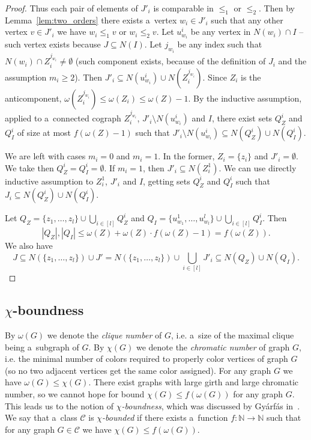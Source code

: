 \documentclass[11pt,a4paper]{article}
\theoremstyle{definition}
\renewcommand{\varnothing}{\emptyset}
\def\C{\mathcal{C}}
\def\N{\mathbb{N}}
\newcommand{\Jadwiga}[2][]{\todo[color=yellow!80,inline,#1]{{\textbf{J:} #2}}}
\begin{document}
\begin{proof}
    Thus each pair of elements of $J'_i$ is comparable in $\leq_1$ or $\leq_2$. Then by Lemma~\ref{lem:two_orders} there exists a~vertex $w_i\in J'_i$ such that any other vertex $v\in J'_i$ we have $w_i\leq_1 v$ or $w_i\leq_2 v$. 
    Let $u^i_{w_i}$ be any vertex in $N(w_i)\cap I$ -- such vertex exists because $J\subseteq N(I)$. Let $j_{w_i}$ be any index such that $N({w_i})\cap Z_i^{j_{w_i}} \neq \varnothing$ (such component exists, because of the definition of $J_i$ and the assumption $m_i\geq 2$). Then $J'_i\subseteq N(u_{w_i}^i)\cup N(Z_i^{j_{w_i}})$. 
    Since $Z_i$ is the anticomponent, $\omega(Z_i^{j_{w_i}})\leq \omega(Z_i) \leq \omega(Z) - 1$. 
    By the inductive assumption, applied to a~connected cograph $Z_i^{j_{w_i}}$, $J'_i\setminus N(u_{w_i}^i)$ and $I$, there exist sets $Q_Z^i$ and $Q_I^i$ of size at most $f(\omega(Z)-1)$ such that $J'_i\setminus N(u_{w_i}^i) \subseteq N(Q_Z^i) \cup N(Q_I^i)$. 

    We are left with cases $m_i=0$ and $m_i=1$. In the former, $Z_i=\{z_i\}$ and $J'_i=\varnothing$. We take then $Q_Z^i=Q_I^i=\varnothing$. If $m_i = 1$, then $J'_i\subseteq N(Z_i^1)$. We can use directly inductive assumption to $Z_i^1$, $J'_i$ and $I$, getting sets $Q_Z^i$ and $Q_I^i$ such that $J_i\subseteq N(Q_Z^i)\cup N(Q_I^i)$.
    
    Let $Q_Z = \{z_1, \dots, z_l\} \cup \bigcup_{i\in [l]} Q_Z^i$ and $Q_I = \{u_{w_1}^1, \dots, u_{w_l}^l\} \cup \bigcup_{i\in [l]} Q_I^i$. Then 
    \[ |Q_Z|, |Q_I|\leq \omega(Z) + \omega(Z) \cdot f(\omega(Z) - 1) = f(\omega(Z)). \]
    We also have $$J \subseteq N(\{z_1, \dots, z_l\})\cup J' = N(\{z_1, \dots, z_l\}) \cup \bigcup_{i\in [l]} J'_i \subseteq N(Q_Z) \cup N(Q_I).$$
\end{proof}


\subsection{$\chi$-boundness}

By $\omega(G)$ we denote the {\it clique number} of $G$, i.e. a~size of the maximal clique being a~subgraph of $G$.  By $\chi(G)$ we denote the {\it chromatic number} of graph $G$, i.e. the minimal number of colors required to properly color vertices of graph $G$ (so no two adjacent vertices get the same color assigned). For any graph $G$ we have $\omega(G)\leq \chi(G)$. There exist graphs with large girth and large chromatic number, so we cannot hope for bound $\chi(G)\leq f(\omega(G))$ for any graph $G$. This leads us to the notion of {\it $\chi$-boundness}, which was discussed by Gyárfás in~\cite{chiBoundness}. We say that a~class $\C$ is $\chi${\it -bounded} if there exists a~function $f\colon \N\to\N$ such that for any graph $G\in\C$ we have $\chi(G)\leq f(\omega(G))$. 
\end{document}
